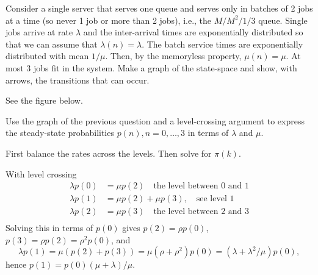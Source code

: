 \begin{exercise}
  Consider a single server that serves one queue and serves only in
  batches of 2 jobs at a time (so never 1 job or more than 2 jobs),
  i.e., the $M/M^2/1/3$ queue.  Single jobs arrive at rate $\lambda$
  and the inter-arrival times are exponentially distributed so that we can assume that $\lambda(n) = \lambda$. The batch service times are exponentially distributed with mean $1/\mu$. Then, by the memoryless property, $\mu(n) = \mu$. At most 3 jobs fit in the system.   Make a graph of the state-space and show, with arrows, the
  transitions that can occur.

  \begin{solution}
See the figure below.

  \end{solution}
\end{exercise}

\begin{exercise}
  Use the graph of the previous question and a level-crossing argument
  to express the steady-state probabilities $p(n),n=0,\ldots, 3$ in
  terms of $\lambda$ and $\mu$.
  \begin{hint}
First balance the rates across the levels. Then solve for $\pi(k)$.
  \end{hint}
  \begin{solution}
With level crossing
  \begin{align*}
    \lambda p(0)  &= \mu p(2) \quad\text{the level between 0 and 1}\\
    \lambda p(1)  &= \mu p(2) +\mu p(3), \quad\text{see level 1}\\
    \lambda p(2)  &= \mu p(3)\quad\text{the level between 2 and 3}\\
  \end{align*}
  Solving this in terms of $p(0)$ gives $p(2) = \rho p(0)$, $p(3) = \rho p(2) = \rho^2p(0)$, and
  \begin{equation*}
    \lambda p(1) = \mu(p(2) + p(3)) = \mu (\rho + \rho^2) p(0) = (\lambda + \lambda^2/\mu) p(0),
  \end{equation*}
hence $p(1) = p(0)(\mu + \lambda)/\mu$. 
  \end{solution}
\end{exercise}



